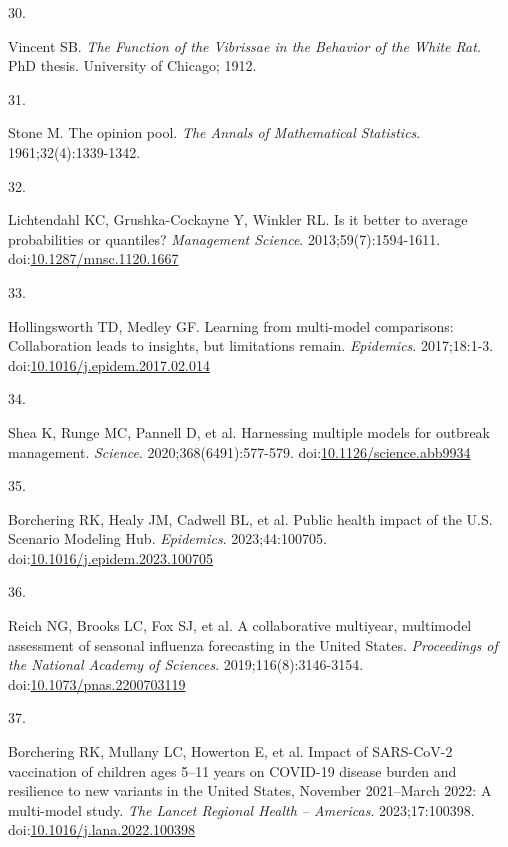 \documentclass[
  letterpaper,
  DIV=11,
  numbers=noendperiod]{scrartcl}
\newlength{\cslhangindent}
\newlength{\csllabelwidth}
\newenvironment{CSLReferences}[2] %
 {\begin{list}{}{%
  \setlength{\itemindent}{0pt}
  \setlength{\leftmargin}{0pt}
  \setlength{\parsep}{0pt}
  \ifodd #1
   \setlength{\leftmargin}{\cslhangindent}
   \setlength{\itemindent}{-1\cslhangindent}
  \fi
  \setlength{\itemsep}{#2\baselineskip}}}
 {\end{list}}
\newcommand{\CSLLeftMargin}[1]{\parbox[t]{\csllabelwidth}{\strut#1\strut}}
\newcommand{\CSLRightInline}[1]{\parbox[t]{\linewidth - \csllabelwidth}{\strut#1\strut}}
\begin{document}
\begin{CSLReferences}{0}{1}
\CSLLeftMargin{30. }%
\CSLRightInline{Vincent SB. \emph{The Function of the Vibrissae in the
Behavior of the White Rat.} PhD thesis. University of Chicago; 1912.}

\CSLLeftMargin{31. }%
\CSLRightInline{Stone M. The opinion pool. \emph{The Annals of
Mathematical Statistics}. 1961;32(4):1339-1342.}

\CSLLeftMargin{32. }%
\CSLRightInline{Lichtendahl KC, Grushka-Cockayne Y, Winkler RL. Is it
better to average probabilities or quantiles? \emph{Management Science}.
2013;59(7):1594-1611.
doi:\href{https://doi.org/10.1287/mnsc.1120.1667}{10.1287/mnsc.1120.1667}}

\CSLLeftMargin{33. }%
\CSLRightInline{Hollingsworth TD, Medley GF. Learning from multi-model
comparisons: {Collaboration} leads to insights, but limitations remain.
\emph{Epidemics}. 2017;18:1-3.
doi:\href{https://doi.org/10.1016/j.epidem.2017.02.014}{10.1016/j.epidem.2017.02.014}}

\CSLLeftMargin{34. }%
\CSLRightInline{Shea K, Runge MC, Pannell D, et al. Harnessing multiple
models for outbreak management. \emph{Science}. 2020;368(6491):577-579.
doi:\href{https://doi.org/10.1126/science.abb9934}{10.1126/science.abb9934}}

\CSLLeftMargin{35. }%
\CSLRightInline{Borchering RK, Healy JM, Cadwell BL, et al. Public
health impact of the {U}.{S}. {Scenario} {Modeling} {Hub}.
\emph{Epidemics}. 2023;44:100705.
doi:\href{https://doi.org/10.1016/j.epidem.2023.100705}{10.1016/j.epidem.2023.100705}}

\CSLLeftMargin{36. }%
\CSLRightInline{Reich NG, Brooks LC, Fox SJ, et al. A collaborative
multiyear, multimodel assessment of seasonal influenza forecasting in
the {United} {States}. \emph{Proceedings of the National Academy of
Sciences}. 2019;116(8):3146-3154.
doi:\href{https://doi.org/10.1073/pnas.2200703119}{10.1073/pnas.2200703119}}

\CSLLeftMargin{37. }%
\CSLRightInline{Borchering RK, Mullany LC, Howerton E, et al. Impact of
{SARS}-{CoV}-2 vaccination of children ages 5--11 years on {COVID}-19
disease burden and resilience to new variants in the {United} {States},
{November} 2021--{March} 2022: {A} multi-model study. \emph{The Lancet
Regional Health -- Americas}. 2023;17:100398.
doi:\href{https://doi.org/10.1016/j.lana.2022.100398}{10.1016/j.lana.2022.100398}}


\end{CSLReferences}
\end{document}
